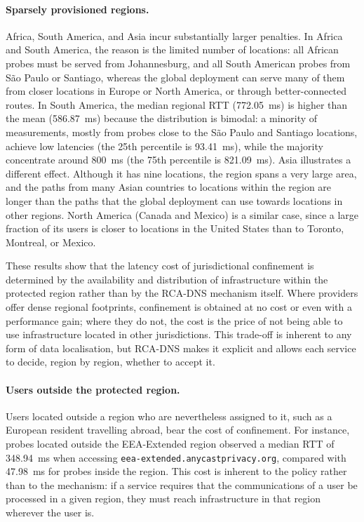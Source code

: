 \paragraph{Sparsely provisioned regions.} Africa, South America, and Asia incur substantially larger penalties. In Africa and South America, the reason is the limited number of locations: all African probes must be served from Johannesburg, and all South American probes from São Paulo or Santiago, whereas the global deployment can serve many of them from closer locations in Europe or North America, or through better-connected routes. In South America, the median regional RTT (772.05~ms) is higher than the mean (586.87~ms) because the distribution is bimodal: a minority of measurements, mostly from probes close to the São Paulo and Santiago locations, achieve low latencies (the 25th percentile is 93.41~ms), while the majority concentrate around 800~ms (the 75th percentile is 821.09~ms). Asia illustrates a different effect. Although it has nine locations, the region spans a very large area, and the paths from many Asian countries to locations within the region are longer than the paths that the global deployment can use towards locations in other regions. North America (Canada and Mexico) is a similar case, since a large fraction of its users is closer to locations in the United States than to Toronto, Montreal, or Mexico. 

These results show that the latency cost of jurisdictional confinement is determined by the availability and distribution of infrastructure within the protected region rather than by the RCA-DNS mechanism itself. Where providers offer dense regional footprints, confinement is obtained at no cost or even with a performance gain; where they do not, the cost is the price of not being able to use infrastructure located in other jurisdictions. This trade-off is inherent to any form of data localisation, but RCA-DNS makes it explicit and allows each service to decide, region by region, whether to accept it.

\paragraph{Users outside the protected region.} Users located outside a region who are nevertheless assigned to it, such as a European resident travelling abroad, bear the cost of confinement. For instance, probes located outside the EEA-Extended region observed a median RTT of 348.94~ms when accessing \texttt{eea-extended.anycastprivacy.org}, compared with 47.98~ms for probes inside the region. This cost is inherent to the policy rather than to the mechanism: if a service requires that the communications of a user be processed in a given region, they must reach infrastructure in that region wherever the user is.

